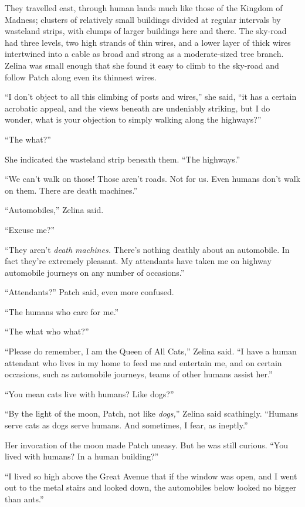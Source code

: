 \documentclass[12pt]{memoir}
\begin{document}
They travelled east, through human lands much like those of the
Kingdom of Madness; clusters of relatively small buildings divided at
regular intervals by wasteland strips, with clumps of larger buildings
here and there. The sky-road had three levels, two high strands of
thin wires, and a lower layer of thick wires intertwined into a cable
as broad and strong as a moderate-sized tree branch. Zelina was small
enough that she found it easy to climb to the sky-road and follow
Patch along even its thinnest wires.

“I don’t object to all this climbing of posts and wires,” she said,
“it has a certain acrobatic appeal, and the views beneath are
undeniably striking, but I do wonder, what is your objection to simply
walking along the highways?”

“The what?”

She indicated the wasteland strip beneath them. “The highways.”

“We can’t walk on those! Those aren’t roads. Not for us. Even humans
don’t walk on them. There are death machines.”

“Automobiles,” Zelina said.

“Excuse me?”

“They aren’t \textit{death machines.} There’s nothing deathly about an
automobile. In fact they’re extremely pleasant. My attendants have
taken me on highway automobile journeys on any number of occasions.”

“Attendants?” Patch said, even more confused.

“The humans who care for me.”

“The what who what?”

“Please do remember, I am the Queen of All Cats,” Zelina said. “I have
a human attendant who lives in my home to feed me and entertain me,
and on certain occasions, such as automobile journeys, teams of other
humans assist her.”

“You mean cats live with humans? Like dogs?”

“By the light of the moon, Patch, not like \textit{dogs,}” Zelina said
scathingly. “Humans serve cats as dogs serve humans. And sometimes, I
fear, as ineptly.”

Her invocation of the moon made Patch uneasy. But he was still
curious. “You lived with humans? In a human building?”

“I lived so high above the Great Avenue that if the window was open,
and I went out to the metal stairs and looked down, the automobiles
below looked no bigger than ants.”
\end{document}
